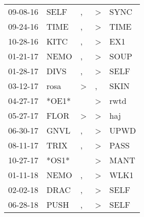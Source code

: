 \begin{supertabular}{p{0.07\textwidth}p{0.06\textwidth}p{0.02\textwidth}p{0.02\textwidth}p{0.06\textwidth}}
          09-08-16\textsuperscript{} &           SELF\textsuperscript{} &                , &     \textgreater &           SYNC\textsuperscript{} \\
          09-24-16\textsuperscript{} &           TIME\textsuperscript{} &                , &     \textgreater &           TIME\textsuperscript{} \\
          10-28-16\textsuperscript{} &           KITC\textsuperscript{} &                , &     \textgreater &            EX1\textsuperscript{} \\
          01-21-17\textsuperscript{} &           NEMO\textsuperscript{} &                , &     \textgreater &           SOUP\textsuperscript{} \\
          01-28-17\textsuperscript{} &           DIVS\textsuperscript{} &                , &     \textgreater &           SELF\textsuperscript{} \\
          03-12-17\textsuperscript{} &           rosa\textsuperscript{} &     \textgreater &                , &           SKIN\textsuperscript{} \\
          04-27-17\textsuperscript{} &                            *OE1* &                  &     \textgreater &           rwtd\textsuperscript{} \\
          05-27-17\textsuperscript{} &           FLOR\textsuperscript{} &     \textgreater &     \textgreater &            haj\textsuperscript{} \\
          06-30-17\textsuperscript{} &           GNVL\textsuperscript{} &                , &     \textgreater &           UPWD\textsuperscript{} \\
          08-11-17\textsuperscript{} &           TRIX\textsuperscript{} &                , &     \textgreater &           PASS\textsuperscript{} \\
          10-27-17\textsuperscript{} &                            *OS1* &                  &     \textgreater &           MANT\textsuperscript{} \\
          01-11-18\textsuperscript{} &           NEMO\textsuperscript{} &                , &     \textgreater &           WLK1\textsuperscript{} \\
          02-02-18\textsuperscript{} &           DRAC\textsuperscript{} &                , &     \textgreater &           SELF\textsuperscript{} \\
          06-28-18\textsuperscript{} &           PUSH\textsuperscript{} &                , &     \textgreater &           SELF\textsuperscript{} \\

\end{supertabular}
